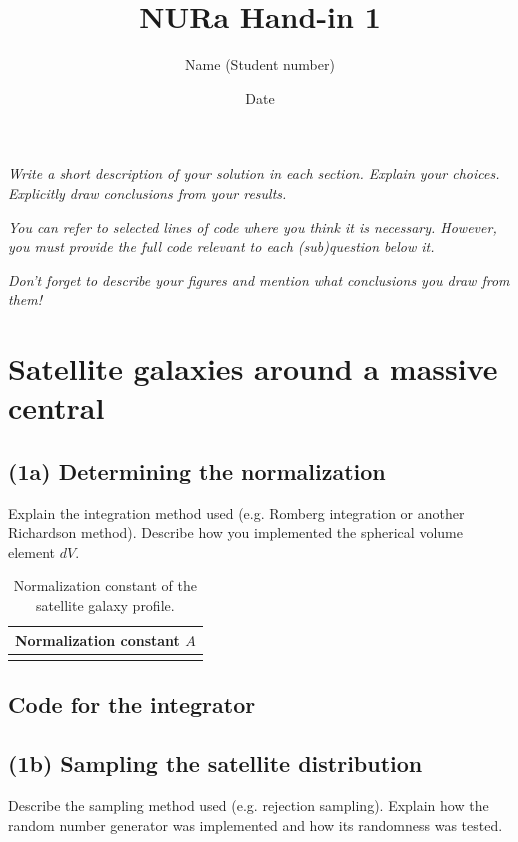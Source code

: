 \documentclass{article}
\title{NURa Hand-in 1}
\author{Name (Student number)}
\date{Date}
\newcommand{\CodeDir}{Code}
\newcommand{\CalcDir}{Calculations}
\begin{document}
\maketitle

\textit{Write a short description of your solution in each section. Explain your choices. Explicitly draw conclusions from your results.}

\textit{You can refer to selected lines of code where you think it is necessary. However, you must provide the full code relevant to each (sub)question below it.}

\textit{Don't forget to describe your figures and mention what conclusions you draw from them!}


\section{Satellite galaxies around a massive central}

\subsection{(1a) Determining the normalization}

Explain the integration method used (e.g. Romberg integration or another Richardson method).  
Describe how you implemented the spherical volume element \(dV\).

\begin{table}[H]
\centering
\caption{Normalization constant of the satellite galaxy profile.}
\begin{tabular}{|c|}
\hline
Normalization constant \(A\) \\
\hline
 \\
\hline
\end{tabular}
\end{table}

\subsection{Code for the integrator}



\subsection{(1b) Sampling the satellite distribution}

Describe the sampling method used (e.g. rejection sampling).  
Explain how the random number generator was implemented and how its randomness was tested.
\end{document}
